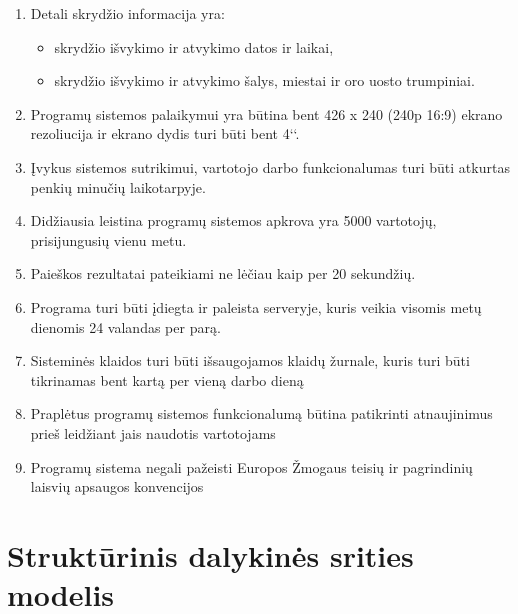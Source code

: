 \documentclass{VUMIFPSkursinis}
\begin{document}
\begin{enumerate}[label=\textbf{NFR\arabic*}.]
                    \item Detali skrydžio informacija yra:
                    \begin{itemize}
                    	\item skrydžio išvykimo ir atvykimo datos ir laikai,
                    	\item skrydžio išvykimo ir atvykimo šalys, miestai ir oro uosto trumpiniai.
                    \end{itemize}
                    \item Programų sistemos palaikymui yra būtina bent 426 x 240 (240p 16:9) ekrano rezoliucija ir ekrano dydis turi būti bent 4‘‘.
                    \item Įvykus sistemos sutrikimui, vartotojo darbo funkcionalumas turi būti atkurtas penkių minučių laikotarpyje.
                    \item Didžiausia leistina programų sistemos apkrova yra 5000 vartotojų, prisijungusių vienu metu.
                    \item Paieškos rezultatai pateikiami ne lėčiau kaip per 20 sekundžių.
                    \item Programa turi būti įdiegta ir paleista serveryje, kuris veikia visomis metų dienomis 24 valandas per parą.
                    \item Sisteminės klaidos turi būti išsaugojamos klaidų žurnale, kuris turi būti tikrinamas bent kartą per vieną darbo dieną
                    \item Praplėtus programų sistemos funkcionalumą būtina patikrinti atnaujinimus prieš leidžiant jais naudotis vartotojams
                    \item Programų sistema negali pažeisti Europos Žmogaus teisių ir pagrindinių laisvių apsaugos konvencijos
                \end{enumerate}
      
        \section{Struktūrinis dalykinės srities modelis}
\end{document}
